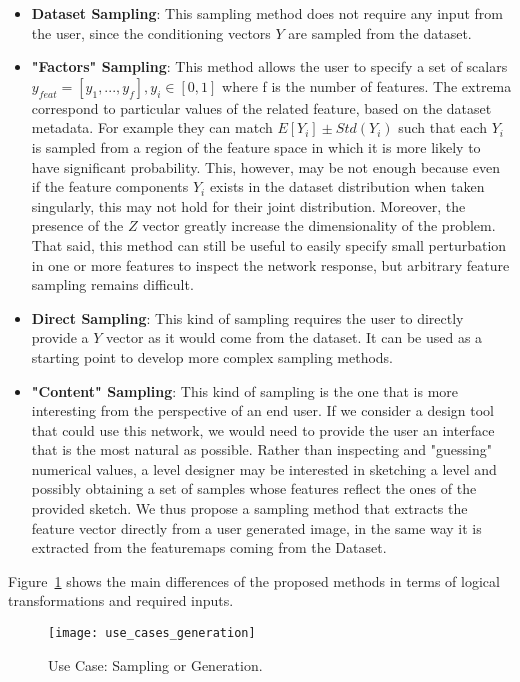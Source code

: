 \begin{itemize}
	\item \textbf{Dataset Sampling}: This sampling method does not require any input from the user, since the conditioning vectors $Y$ are sampled from the dataset.
	\item \textbf{"Factors" Sampling}: This method allows the user to specify a set of scalars $y_{feat} = [y_1, ..., y_f] , y_i \in [0,1]$ where f is the number of features. The extrema correspond to particular values of the related feature, based on the dataset metadata. For example they can match $E[Y_{i}] \pm Std(Y_{i})$ such that each $Y_{i}$ is sampled from a region of the feature space in which it is more likely to have significant probability. This, however, may be not enough because even if the feature components $Y_{i}$ exists in the dataset distribution when taken singularly, this may not hold for their joint distribution. Moreover, the presence of the $Z$ vector greatly increase the dimensionality of the problem. That said, this method can still be useful to easily specify small perturbation in one or more features to inspect the network response, but arbitrary feature sampling remains difficult.
	\item \textbf{Direct Sampling}: This kind of sampling requires the user to directly provide a $Y$ vector as it would come from the dataset. It can be used as a starting point to develop more complex sampling methods.
	\item \textbf{"Content" Sampling}: This kind of sampling is the one that is more interesting from the perspective of an end user. If we consider a design tool that could use this network, we would need to provide the user an interface that is the most natural as possible. Rather than inspecting and "guessing" numerical values, a level designer may be interested in sketching a level and possibly obtaining a set of samples whose features reflect the ones of the provided sketch. We thus propose a sampling method that extracts the feature vector directly from a user generated image, in the same way it is extracted from the \glspl{featuremap} coming from the Dataset.
\end{itemize}
Figure~\ref{fig:usecase_sampling} shows the main differences of the proposed methods in terms of logical transformations and required inputs.

\begin{figure}[h!]
	\begin{center}
		\texttt{[image: use\_cases\_generation]}
	\end{center}
	
	\captionsetup{width=\linewidth}
	\caption[Use Case: Sampling or Generation]{Use Case: Sampling or Generation.}
	\label{fig:usecase_sampling}
\end{figure}




